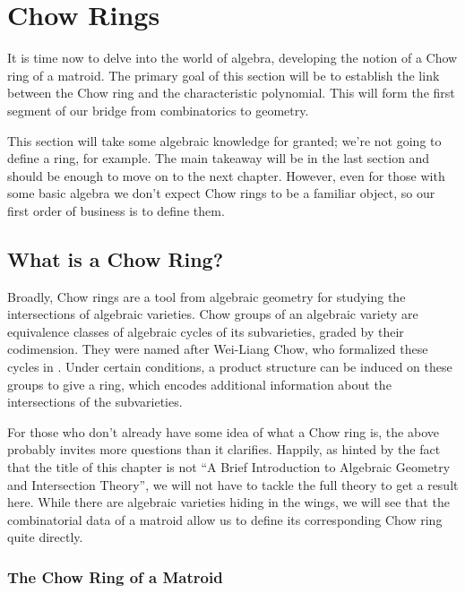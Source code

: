 \documentclass[12pt,oneside]{../../sfsuthesis}
\begin{document}
\chapter{Chow Rings}

It is time now to delve into the world of algebra, developing the notion of a Chow ring of a matroid.
The primary goal of this section will be to establish the link between the Chow ring and the characteristic polynomial.
This will form the first segment of our bridge from combinatorics to geometry.

This section will take some algebraic knowledge for granted; we're not going to define a ring, for example.
The main takeaway will be in the last section and should be enough to move on to the next chapter.
However, even for those with some basic algebra we don't expect Chow rings to be a familiar object, so our first order of business is to define them.

\section{What is a Chow Ring?}

Broadly, Chow rings are a tool from algebraic geometry for studying the intersections of algebraic varieties.
Chow groups of an algebraic variety are equivalence classes of algebraic cycles of its subvarieties, graded by their codimension.
They were named after Wei-Liang Chow, who formalized these cycles in \cite{chowEquivalenceClassesCycles1956}.
Under certain conditions, a product structure can be induced on these groups to give a ring, which encodes additional information about the intersections of the subvarieties.

For those who don't already have some idea of what a Chow ring is, the above probably invites more questions than it clarifies.
Happily, as hinted by the fact that the title of this chapter is not ``A Brief Introduction to Algebraic Geometry and Intersection Theory'', we will not have to tackle the full theory to get a result here.
While there are algebraic varieties hiding in the wings, we will see that the combinatorial data of a matroid allow us to define its corresponding Chow ring quite directly.

\subsection{The Chow Ring of a Matroid}
\end{document}
